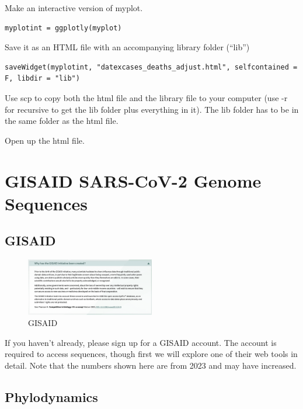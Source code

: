 \documentclass[
]{book}
\begin{document}
Make an interactive version of myplot.

\begin{verbatim}
myplotint = ggplotly(myplot)
\end{verbatim}

Save it as an HTML file with an accompanying library folder (``lib'')

\begin{verbatim}
saveWidget(myplotint, "datexcases_deaths_adjust.html", selfcontained = F, libdir = "lib")
\end{verbatim}

Use scp to copy both the html file and the library file to your computer (use -r for recursive to get the lib folder plus everything in it). The lib folder has to be in the same folder as the html file.

Open up the html file.

\hypertarget{gisaid-sars-cov-2-genome-sequences}{%
\chapter{GISAID SARS-CoV-2 Genome Sequences}\label{gisaid-sars-cov-2-genome-sequences}}

\hypertarget{gisaid}{%
\section{GISAID}\label{gisaid}}

\begin{figure}
\centering
\includegraphics[width=0.5\textwidth,height=\textheight]{./Figures/gisaid.png}
\caption{GISAID}
\end{figure}

If you haven't already, please sign up for a GISAID account. The account is required to access sequences, though first we will explore one of their web tools in detail. Note that the numbers shown here are from 2023 and may have increased.

\hypertarget{phylodynamics}{%
\section{Phylodynamics}\label{phylodynamics}}
\end{document}
